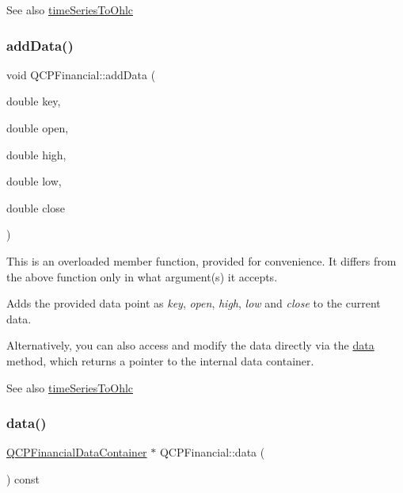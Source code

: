 \begin{DoxySeeAlso}{See also}
\hyperlink{class_q_c_p_financial_a9a058c035040d3939b8884f4aaccb1a7}{time\+Series\+To\+Ohlc} 
\end{DoxySeeAlso}
\mbox{\label{class_q_c_p_financial_a688bbd052e00a02954ddb0068b378170}} 
\subsubsection{\texorpdfstring{add\+Data()}{addData()}\hspace{0.1cm}{\footnotesize\ttfamily [2/2]}}
{\footnotesize\ttfamily void Q\+C\+P\+Financial\+::add\+Data (\begin{DoxyParamCaption}\item[{double}]{key,  }\item[{double}]{open,  }\item[{double}]{high,  }\item[{double}]{low,  }\item[{double}]{close }\end{DoxyParamCaption})}

This is an overloaded member function, provided for convenience. It differs from the above function only in what argument(s) it accepts.

Adds the provided data point as {\itshape key}, {\itshape open}, {\itshape high}, {\itshape low} and {\itshape close} to the current data.

Alternatively, you can also access and modify the data directly via the \hyperlink{class_q_c_p_financial_aec3f666271cf48bd7b87d84fe3f8c074}{data} method, which returns a pointer to the internal data container.

\begin{DoxySeeAlso}{See also}
\hyperlink{class_q_c_p_financial_a9a058c035040d3939b8884f4aaccb1a7}{time\+Series\+To\+Ohlc} 
\end{DoxySeeAlso}
\mbox{\label{class_q_c_p_financial_aec3f666271cf48bd7b87d84fe3f8c074}} 
\subsubsection{\texorpdfstring{data()}{data()}}
{\footnotesize\ttfamily \hyperlink{class_q_c_p_data_container}{Q\+C\+P\+Financial\+Data\+Container} $\ast$ Q\+C\+P\+Financial\+::data (\begin{DoxyParamCaption}{ }\end{DoxyParamCaption}) const\hspace{0.3cm}{\ttfamily [inline]}}

